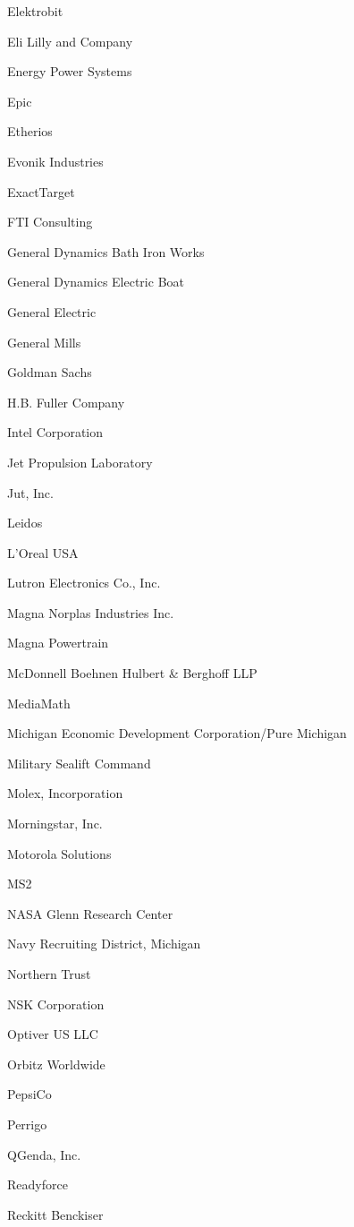 \documentclass[twoside]{article}
\begin{document}
\begin{center}
\begin{multicols}{5}
\begin{FlushLeft}
\begin{compactitem}
\item Elektrobit
\item Eli Lilly and Company
\item Energy Power Systems
\item Epic
\item Etherios
\item Evonik Industries
\item ExactTarget
\item FTI Consulting
\item General Dynamics Bath Iron Works
\item General Dynamics Electric Boat
\item General Electric
\item General Mills
\item Goldman Sachs
\item H.B. Fuller Company
\item Intel Corporation
\item Jet Propulsion Laboratory
\item Jut, Inc.
\item Leidos
\item L'Oreal USA
\item Lutron Electronics Co., Inc.
\item Magna Norplas Industries Inc.
\item Magna Powertrain
\item McDonnell Boehnen Hulbert \& Berghoff LLP
\item MediaMath
\item Michigan Economic Development Corporation/Pure Michigan
\item Military Sealift Command
\item Molex, Incorporation
\item Morningstar, Inc.
\item Motorola Solutions
\item MS2
\item NASA Glenn Research Center
\item Navy Recruiting District, Michigan
\item Northern Trust
\item NSK Corporation
\item Optiver US LLC
\item Orbitz Worldwide
\item PepsiCo
\item Perrigo
\item QGenda, Inc.
\item Readyforce
\item Reckitt Benckiser

\end{compactitem}
\end{FlushLeft}
\end{multicols}
\end{center}
\end{document}
